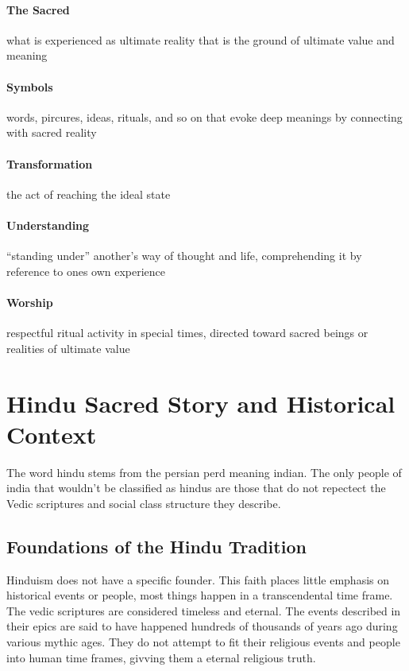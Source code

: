 \documentclass{article}
\begin{document}
\paragraph{The Sacred}
\label{par:the_sacred}
what is experienced as ultimate reality that is the ground of ultimate value and meaning

\paragraph{Symbols}
\label{par:symbols}
words, pircures, ideas, rituals, and so on that evoke deep meanings by connecting with sacred reality

\paragraph{Transformation}
\label{par:transformation}
the act of reaching the ideal state

\paragraph{Understanding}
\label{par:understanding}
``standing under'' another's way of thought and life, comprehending it by reference to ones own experience

\paragraph{Worship}
\label{par:worship}
respectful ritual activity in special times, directed toward sacred beings or realities of ultimate value

\section{Hindu Sacred Story and Historical Context}
\label{sec:hindu_sacred_story_and_historical_context}
The word hindu stems from the persian perd meaning indian. The only people of india that wouldn't be classified as hindus are those that do not repectect the Vedic scriptures and social class structure they describe.

\subsection{Foundations of the Hindu Tradition}
\label{sub:foundations_of_the_hindu_tradition}
Hinduism does not have a specific founder. This faith places little emphasis on historical events or people, most things happen in a transcendental time frame. The vedic scriptures are considered timeless and eternal. The events described in their epics are said to have happened hundreds of thousands of years ago during various mythic ages. They do not attempt to fit their religious events and people into human time frames, givving them a eternal religious truth.
\end{document}
